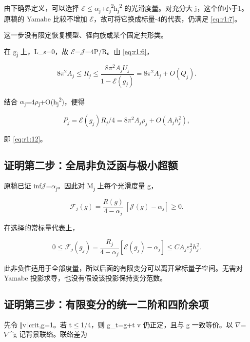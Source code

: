 \documentclass[UTF8,11pt,openany,oneside,fontset=none]{ctexbook}
\begin{document}
由下确界定义，可以选择 \(\mathcal E\)\(\le\)\(\alpha\)\textsubscript{j}+\(\varepsilon\)\textsubscript{j}\textsuperscript{2}h\textsubscript{j}\textsuperscript{2} 的光滑度量。对充分大 j，这个值小于1。原稿的 Yamabe 比较不增加 \(\mathcal E\)，故可将它换成标量-4的代表，仍满足 \eqref{eq:r1:7}。

这一步没有限定恢复模型、径向族或某个固定共形类。

在 g\textsubscript{j} 上，L\_s=0，故 \(\mathcal E\)=\(\mathcal J\)=4P/R。由 \eqref{eq:r1:6}，

\[
8\pi^2A_j\le R_j\le\frac{8\pi^2A_jU_j}{1-\mathcal E(g_j)}
=8\pi^2A_j+O(Q_j).
\]

结合 \(\alpha\)\textsubscript{j}=4\(\rho\)\textsubscript{j}+O(h\textsubscript{j}\textsuperscript{2})，便得

\[
P_j=\mathcal E(g_j)R_j/4
=8\pi^2A_j\rho_j+O(A_jh_j^2),
\]

即 \eqref{eq:r1:12}。

\subsection{证明第二步：全局非负泛函与极小超额}\label{ch1:ux8bc1ux660eux7b2cux4e8cux6b65ux5168ux5c40ux975eux8d1fux6cdbux51fdux4e0eux6781ux5c0fux8d85ux989d}

原稿已证 inf\(\mathcal J\)=\(\alpha\)\textsubscript{j}。因此对 M\textsubscript{j} 上每个光滑度量 g，

\[
\mathscr F_j(g)
=\frac{R(g)}{4-\alpha_j}\,[\mathcal J(g)-\alpha_j]\ge0.
\tag{1.13}\label{eq:r1:13}
\]

在选择的常标量代表上，

\[
0\le\mathscr F_j(g_j)
=\frac{R_j}{4-\alpha_j}[\mathcal E(g_j)-\alpha_j]
\le C A_j\varepsilon_j^2h_j^2.
\tag{1.14}\label{eq:r1:14}
\]

此非负性适用于全部度量，所以后面的有限变分可以离开常标量子空间。无需对 Yamabe 投影求导，也没有假设该投影保持变分范数。

\subsection{证明第三步：有限变分的统一二阶和四阶余项}\label{ch1:ux8bc1ux660eux7b2cux4e09ux6b65ux6709ux9650ux53d8ux5206ux7684ux7edfux4e00ux4e8cux9636ux548cux56dbux9636ux4f59ux9879}

先令 \(\Vert\)v\(\Vert\)crit,g=1。若 \textbar t\textbar\(\le\)1/4，则 g\_t=g+t v 仍正定，且与 g 一致等价。以 \(\nabla\)=\(\nabla\)\^{}g 记背景联络。联络差为
\end{document}
